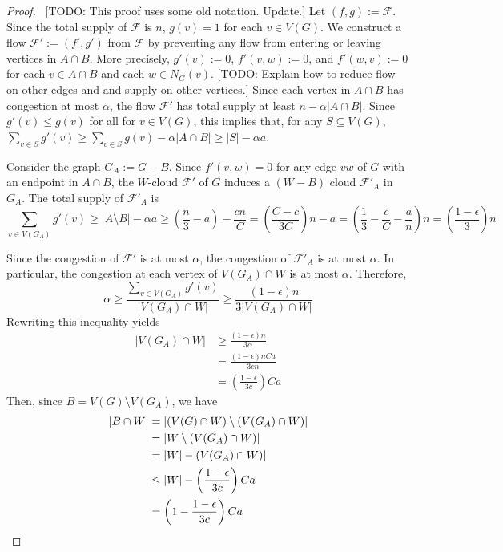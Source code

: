 \documentclass{patmorin}
\begin{document}
\begin{proof}
  \ [TODO: This proof uses some old notation. Update.]
  Let $(f,g):=\mathcal{F}$.  Since the total supply of $\mathcal{F}$ is $n$, $g(v)=1$ for each $v\in V(G)$.  We construct a flow $\mathcal{F}':=(f',g')$  from $\mathcal{F}$ by preventing any flow from entering or leaving vertices in $A\cap B$.  More precisely, $g'(v):=0$, $f'(v,w):=0$, and $f'(w,v):=0$ for each $v\in A\cap B$ and each $w\in N_G(v)$.  [TODO: Explain how to reduce flow on other edges and and supply on other vertices.]   Since each vertex in $A\cap B$ has congestion at most $\alpha$, the flow $\mathcal{F}'$ has total supply at least $n-\alpha|A\cap B|$.  Since $g'(v)\le g(v)$ for all for $v\in V(G)$, this implies that, for any $S\subseteq V(G)$, $\sum_{v\in S} g'(v)\ge \sum_{v\in S}g(v) - \alpha|A\cap B|\ge |S| - \alpha a$.

  Consider the graph $G_A:=G-B$.  Since $f'(v,w)=0$ for any edge $vw$ of $G$ with an endpoint in $A\cap B$, the $W$-cloud $\mathcal{F}'$ of $G$ induces a $(W-B)$ cloud $\mathcal{F}'_A$ in $G_A$.  The total supply of $\mathcal{F}'_A$ is
  \[
     \sum_{v\in V(G_A)} g'(v) \ge |A\setminus B| -\alpha a \ge \left(\frac{n}{3}-a\right) - \frac{{c}n}{C} = \left(\frac{C-c}{3C}\right)n - a = \left(\frac{1}{3}-\frac{c}{C}-\frac{a}{n}\right)n
     = \left(\frac{1-\epsilon}{3}\right)n
  \]

  Since the congestion of $\mathcal{F}'$ is at most $\alpha$, the congestion of $\mathcal{F}'_A$ is at most $\alpha$.  In particular, the congestion at each vertex of $V(G_A)\cap W$ is at most $\alpha$.  Therefore,
  \[
     \alpha \ge \frac{\sum_{v\in V(G_A)} g'(v)}{|V(G_A)\cap W|}
     \ge \frac{(1-\epsilon)n}{3|V(G_A)\cap W|}
  \]
  Rewriting this inequality yields
  \begin{align*}
    |V(G_A)\cap W|
    & \ge \frac{(1-\epsilon)n}{3\alpha}\\
    & = \frac{(1-\epsilon)nCa}{3cn}\\
    & = \left(\frac{1-\epsilon}{3c}\right) Ca
  \end{align*}
  Then, since $B=V(G)\setminus V(G_A)$, we have
  \begin{align*}
    |B\cap W|
      & = |(V(G)\cap W)\setminus(V(G_A)\cap W)| \\
      & = |W\setminus(V(G_A)\cap W)| \\
      & = |W|-(V(G_A)\cap W)| \\
      & \le |W|-\left(\frac{1-\epsilon}{3c}\right)Ca \\
      & = \left(1-\frac{1-\epsilon}{3c}\right)Ca \qedhere
  \end{align*}
\end{proof}
\end{document}

